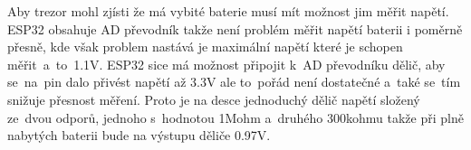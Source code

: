 Aby trezor mohl zjísti že má vybité baterie musí mít možnost jim měřit napětí. ESP32 obsahuje AD převodník takže není problém měřit napětí baterii 
i poměrně přesně, kde však problem nastává je maximální napětí které je schopen měřit~a~to~1.1V. ESP32 sice má možnost připojit k~AD převodníku dělič,
aby se~na~pin dalo přivést napětí až 3.3V ale to~pořád není dostatečné a~také se~tím snižuje přesnost měření. Proto je na desce jednoduchý dělič napětí
složený ze~dvou odporů, jednoho s~hodnotou 1Mohm a~druhého 300kohmu takže při plně nabytých baterii bude na výstupu děliče 0.97V.

\newpage